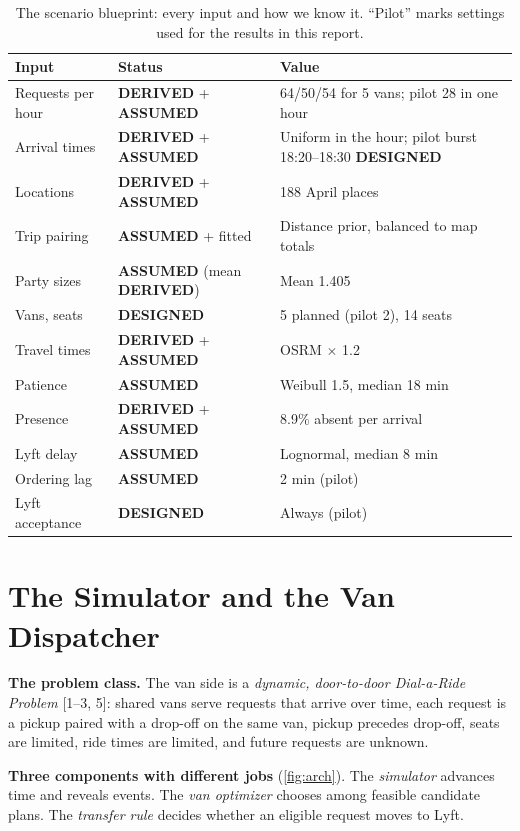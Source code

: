 \documentclass{article}
\newcommand{\lab}[1]{{\footnotesize\textsf{\textbf{#1}}}}
\newcommand{\DER}{\lab{DERIVED}}
\newcommand{\ASM}{\lab{ASSUMED}}
\newcommand{\DES}{\lab{DESIGNED}}
\begin{document}
\begin{table}[!ht]
\centering\small
\caption{The scenario blueprint: every input and how we know it. ``Pilot'' marks settings used for the results in this report.}\label{tab:blueprint}
\begin{tabularx}{\columnwidth}{@{}P{2.0cm}P{2.0cm}L@{}}
\toprule
\textbf{Input} & \textbf{Status} & \textbf{Value}\\
\midrule
Requests per hour & \DER{} + \ASM & 64/50/54 for 5 vans; pilot 28 in one hour\\
Arrival times & \DER{} + \ASM & Uniform in the hour; pilot burst 18:20--18:30 \DES\\
Locations & \DER{} + \ASM & 188 April places\\
Trip pairing & \ASM{} + fitted & Distance prior, balanced to map totals\\
Party sizes & \ASM{} (mean \DER) & Mean 1.405\\
Vans, seats & \DES & 5 planned (pilot 2), 14 seats\\
Travel times & \DER{} + \ASM & OSRM $\times$ 1.2\\
Patience & \ASM & Weibull 1.5, median 18 min\\
Presence & \DER{} + \ASM & 8.9\% absent per arrival\\
Lyft delay & \ASM & Lognormal, median 8 min\\
Ordering lag & \ASM & 2 min (pilot)\\
Lyft acceptance & \DES & Always (pilot)\\
\bottomrule
\end{tabularx}
\end{table}

\section{The Simulator and the Van Dispatcher}\label{sec:sim}

\textbf{The problem class.} The van side is a \emph{dynamic, door-to-door Dial-a-Ride Problem} [1--3, 5]: shared vans serve requests that arrive over time, each request is a pickup paired with a drop-off on the same van, pickup precedes drop-off, seats are limited, ride times are limited, and future requests are unknown.

\textbf{Three components with different jobs} (\cref{fig:arch}). The \emph{simulator} advances time and reveals events. The \emph{van optimizer} chooses among feasible candidate plans. The \emph{transfer rule} decides whether an eligible request moves to Lyft.
\end{document}
